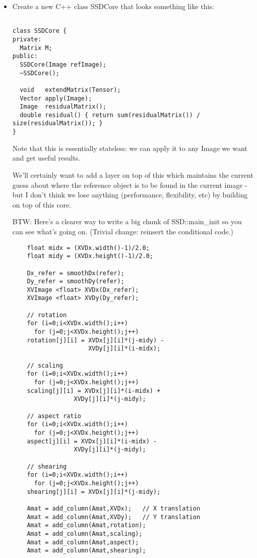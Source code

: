 \begin{itemize}
\begin{itemize}
\item
Create a new C++ class SSDCore that looks something like this:
\begin{verbatim}

class SSDCore {
private:
  Matrix M;
public:
  SSDCore(Image refImage);
  ~SSDCore();

  void   extendMatrix(Tensor);
  Vector apply(Image);
  Image  residualMatrix(); 
  double residual() { return sum(residualMatrix()) / size(residualMatrix()); }
}
\end{verbatim}

Note that this is essentially stateless: we can apply it to any Image
we want and get useful results.

We'll certainly want to add a layer on top of this which maintains the
current guess about where the reference object is to be found in the
current image - but I don't think we lose anything (performance,
flexibility, etc) by building on top of this core.

BTW:
Here's a clearer way to write a big chunk of SSD::main\_init
so you can see what's going on.  (Trivial change: reinsert the 
conditional code.)

\begin{verbatim}
    float midx = (XVDx.width()-1)/2.0;
    float midy = (XVDx.height()-1)/2.0;

    Dx_refer = smoothDx(refer);
    Dy_refer = smoothDy(refer);
    XVImage <float> XVDx(Dx_refer);
    XVImage <float> XVDy(Dy_refer);

    // rotation
    for (i=0;i<XVDx.width();i++)
      for (j=0;j<XVDx.height();j++)
	rotation[j][i] = XVDx[j][i]*(j-midy) - 
	                 XVDy[j][i]*(i-midx); 

    // scaling
    for (i=0;i<XVDx.width();i++)
      for (j=0;j<XVDx.height();j++)
	scaling[j][i] = XVDx[j][i]*(i-midx) + 
	             XVDy[j][i]*(j-midy); 

    // aspect ratio
    for (i=0;i<XVDx.width();i++)
      for (j=0;j<XVDx.height();j++)
	aspect[j][i] = XVDx[j][i]*(i-midx) - 
	             XVDy[j][i]*(j-midy); 

    // shearing
    for (i=0;i<XVDx.width();i++)
      for (j=0;j<XVDx.height();j++)
	shearing[j][i] = XVDx[j][i]*(j-midy);

    Amat = add_column(Amat,XVDx);   // X translation
    Amat = add_column(Amat,XVDy);   // Y translation
    Amat = add_column(Amat,rotation);
    Amat = add_column(Amat,scaling);
    Amat = add_column(Amat,aspect);
    Amat = add_column(Amat,shearing);
\end{verbatim}
\end{itemize} %
\end{itemize} %

